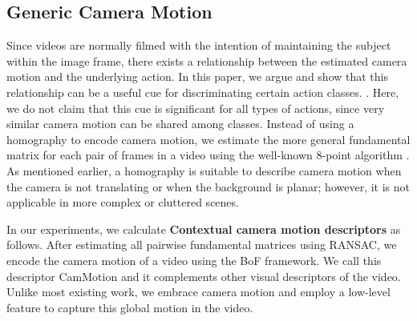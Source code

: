 
\subsection{Generic Camera Motion}
Since videos are normally filmed with the intention of maintaining the subject within the image frame, there exists a relationship between the estimated camera motion and the underlying action. In this paper, we argue and show that this relationship can be a useful cue for discriminating certain action classes. . Here, we do not claim that this cue is significant for all types of actions, since very similar camera motion can be shared among classes.  Instead of using a homography to encode camera motion, we estimate the more general fundamental matrix for each pair of frames in a video using the well-known 8-point algorithm \cite{eightpoint97}. As mentioned earlier, a homography is suitable to describe camera motion when the camera is not translating or when the background is planar; however, it is not applicable in more complex or cluttered scenes.

In our experiments, we calculate \textbf{Contextual camera motion descriptors} as follows. After estimating all pairwise fundamental matrices using RANSAC, we encode the camera motion of a video using the BoF framework. We call this descriptor CamMotion and it complements other visual descriptors of the video. Unlike most existing work, we embrace camera motion and employ a low-level feature to capture this global motion in the video.




